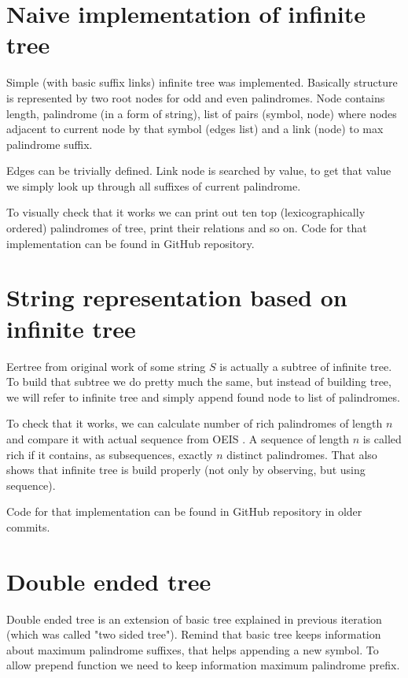 \section{Naive implementation of infinite tree}
Simple (with basic suffix links) infinite tree was implemented. Basically structure is represented by two root nodes for odd and even palindromes. Node contains length, palindrome (in a form of string), list of pairs (symbol, node) where nodes adjacent to current node by that symbol (edges list) and a link (node) to max palindrome suffix.  

Edges can be trivially defined. Link node is searched by value, to get that value we simply look up through all suffixes of current palindrome.

To visually check that it works we can print out ten top (lexicographically ordered)  palindromes of tree, print their relations and so on. 
Code for that implementation can be found in GitHub repository\cite{khazhix3}.



\section{String representation based on infinite tree}
Eertree from original work\cite{RUBINCHIK2018249} of some string $S$ is actually a subtree of infinite tree. To build that subtree we do pretty much the same, but instead of building tree, we will refer to infinite tree and simply append found node to list of palindromes.

To check that it works, we can calculate number of rich palindromes of length $n$ and compare it with actual sequence from OEIS \cite{oeisA216264}. A sequence of length $n$ is called rich if it contains, as subsequences, exactly $n$ distinct palindromes. That also shows that infinite tree is build properly (not only by observing, but using sequence).

Code for that implementation can be found in GitHub repository in older commits\cite{khazhix4}.

\section{Double ended tree}
Double ended tree is an extension of basic tree explained in previous iteration\cite{khazhix5} (which was called "two sided tree"). Remind that basic tree keeps information about maximum palindrome suffixes, that helps appending a new symbol. To allow prepend function we need to keep information maximum palindrome prefix.

